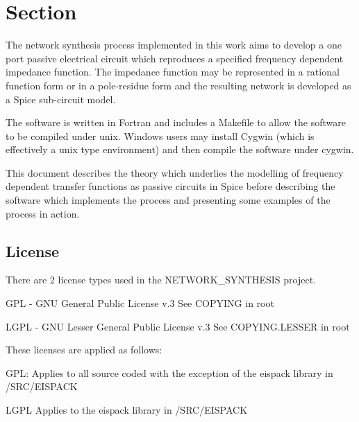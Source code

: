 \section{Section}\label{introduction}

The network synthesis process implemented in this work aims to develop a one port passive electrical circuit which reproduces a specified frequency dependent impedance function. The impedance function may be represented in a rational function form or in a pole-residue form and the resulting network is developed as a Spice sub-circuit model. 

The software is written in Fortran and includes a Makefile to allow the software to be compiled under unix. Windows users may install Cygwin (which is effectively a unix type environment) and then compile the software under cygwin. 

This document describes the theory which underlies the modelling of frequency dependent transfer functions as passive circuits in Spice before describing the software which implements the process and presenting some examples of the process in action. 

\subsection{License}

There are 2 license types used in the NETWORK\_SYNTHESIS project.

GPL - GNU General Public License v.3
See COPYING in root

LGPL - GNU Lesser General Public License v.3
See COPYING.LESSER in root

These licenses are applied as follows:

GPL: 
Applies to all source coded with the exception of the eispack library in /SRC/EISPACK

LGPL
Applies to the eispack library in /SRC/EISPACK

